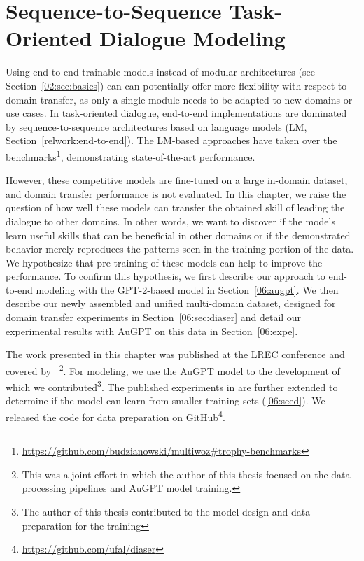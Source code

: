 \chapter{Sequence-to-Sequence Task-Oriented Dialogue Modeling}
\label{06:chap:lm-tod}
Using end-to-end trainable models instead of modular architectures (see Section~\ref{02:sec:basics}) can can potentially offer more flexibility with respect to domain transfer, as only a single module needs to be adapted to new domains or use cases.
In task-oriented dialogue, end-to-end implementations are dominated by sequence-to-sequence architectures based on language models (LM, Section~\ref{relwork:end-to-end}).
The LM-based approaches have taken over the benchmarks\footnote{\url{https://github.com/budzianowski/multiwoz\#trophy-benchmarks}}, demonstrating state-of-the-art performance.

However, these competitive models are fine-tuned on a large in-domain dataset, and domain transfer performance is not evaluated.
In this chapter, we raise the question of how well these models can transfer the obtained skill of leading the dialogue to other domains.
In other words, we want to discover if the models learn useful skills that can be beneficial in other domains or if the demonstrated behavior merely reproduces the patterns seen in the training portion of the data.
We hypothesize that pre-training of these models can help to improve the performance.
To confirm this hypothesis, we first describe our approach to end-to-end modeling with the GPT-2-based model \cite{kulhanek-etal-2021-augpt} in Section~\ref{06:augpt}.
We then describe our newly assembled and unified multi-domain dataset, designed for domain transfer experiments in Section~\ref{06:sec:diaser} and detail our experimental results with AuGPT on this data in Section~\ref{06:expe}.

The work presented in this chapter was published at the LREC conference and covered by~\citet{hudecek-etal-2022-unifying}
\footnote{This was a joint effort in which the author of this thesis focused on the data processing pipelines and AuGPT model training.}.
For modeling, we use the AuGPT model \cite{kulhanek-etal-2021-augpt} to the development of which we contributed\footnote{The author of this thesis contributed to the model design and data preparation for the training}.
The published experiments in \citet{hudecek-etal-2022-unifying} are further extended to determine if the model can learn from smaller training sets (\ref{06:seed}).
We released the code for data preparation on GitHub\footnote{\url{https://github.com/ufal/diaser}}.

